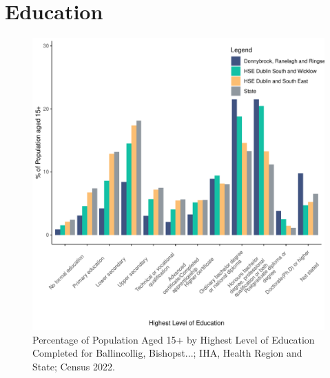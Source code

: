 \documentclass{article}
\begin{document}
\section{Education}\label{sect:Edu}
\begin{figure}[H]
	\centering
	\includegraphics[width = 120mm]{../figures/EduED.pdf}
	\caption{Percentage of Population Aged 15+ by Highest Level of Education Completed for Ballincollig, Bishopst...; IHA, Health Region and State; Census 2022.}
	\label{fig:vbnv}
	\end{figure}
\end{document}
